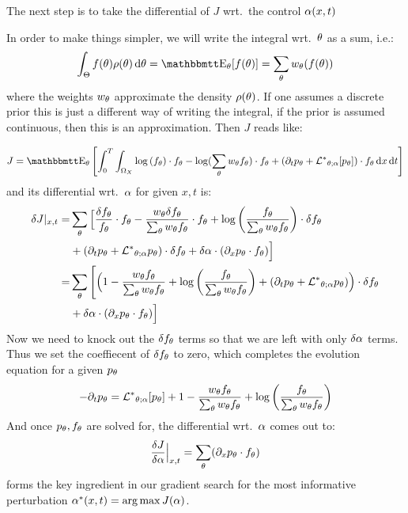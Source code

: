 The next step is to take the differential of $J$ wrt.\ the control
$\alpha(x,t)$


In order to make things simpler, we will write the integral wrt.\
${ \theta}$ as a sum, i.e.:
$$
\int_\Theta f(\th) \rho(\th) \intd{\th} = \Exp_\th [f(\th) ] = 
\sum_\th w_\th (f(\th))
$$ where the weights $w_{ \theta}$ approximate the density $\rho({ \theta})$.
If one assumes a discrete prior this is just a different way of writing the
integral, if the prior is assumed continuous, then this is an approximation.
Then $J$ reads like:

$$
J =  \Exp_\th
\left[ \int_0^T\int_{\O_X} \log\left(f_\th\right)\cdot \ft - 
\log(\sum_\th \wt \ft) \cdot f_\th 
 			 + 
 			 (\di_t p_\th + \Lstar_{\th;\a} [p_\th] ) \cdot f_\th
\intd{x}
\intd{t} \right]
$$
and its differential wrt.\ $\alpha$ for given $x,t$ is:
\begin{align*}
\delta J|_{x,t} =& \sum_{ \theta} \Big[
\frac{{ \delta f_{ \theta}}}{{ f_{ \theta}}} \cdot { f_{ \theta}} - \frac{  w_{ \theta} { \delta f_{ \theta}} }{\sum_{ \theta} w_{ \theta}{ f_{ \theta}}}\cdot { f_{ \theta}} 
+ \log\left(\frac{f_{ \theta}} {\sum_{ \theta} { w_{ \theta} } { f_{ \theta}} }\right) \cdot { \delta f_{ \theta}}  
\\&
+  ({\partial}_t p_{ \theta} + { { \mathcal{L} }^* }_{{ \theta};\alpha} p_{ \theta} ) \cdot { \delta f_{ \theta}}
+ \delta \alpha \cdot ({\partial}_x { p_{ \theta}} \cdot { f_{ \theta}})
\Big]
\\
=& \sum_{ \theta} \Bigg[\Big(
1 - \frac{  w_{ \theta} { f_{ \theta}} }{\sum_{ \theta} w_{ \theta}{ f_{ \theta}}} 
+ \log\left(\frac{f_{ \theta}} {\sum_{ \theta} { w_{ \theta} } { f_{ \theta}} }\right)   
+  ({\partial}_t p_{ \theta} + { { \mathcal{L} }^* }_{{ \theta};\alpha} p_{ \theta} )
\Big)  \cdot { \delta f_{ \theta}} 
\\
&+ \delta \alpha \cdot ({\partial}_x { p_{ \theta}} \cdot { f_{ \theta}})
\Big]
\end{align*}
Now we need to knock out the ${ \delta f_{ \theta}}$ terms so that we are left with only $\delta
\alpha$ terms. Thus we set the coeffiecent of ${ \delta f_{ \theta}}$ to zero, which completes the 
evolution equation for a given $p_{ \theta}$
\begin{equation}
-{\partial}_t { p_{ \theta}} = 
{ { \mathcal{L} }^* }_{{ \theta};\alpha} [p_{ \theta}] +  
1 - \frac{  w_{ \theta} { f_{ \theta}} }{\sum_{ \theta} w_{ \theta}{ f_{ \theta}}} 
+ \log\left(\frac{f_{ \theta}} {\sum_{ \theta} { w_{ \theta} } { f_{ \theta}} }\right)   
\end{equation}
And once ${ p_{ \theta}}, { f_{ \theta}}$ are solved for, the differential wrt.\ $\alpha$ comes
out to:
\begin{equation}
\frac {\delta J}{\delta \alpha} \Big|_{x,t} = \sum_{ \theta} ({\partial}_x { p_{ \theta}} \cdot { f_{ \theta}})
\label{eq:differential_objective_wrt_control_final}
\end{equation}
 forms the key ingredient
in our gradient search for the most informative perturbation $\a^*(x,t) =
\argmax J(\a)$.


